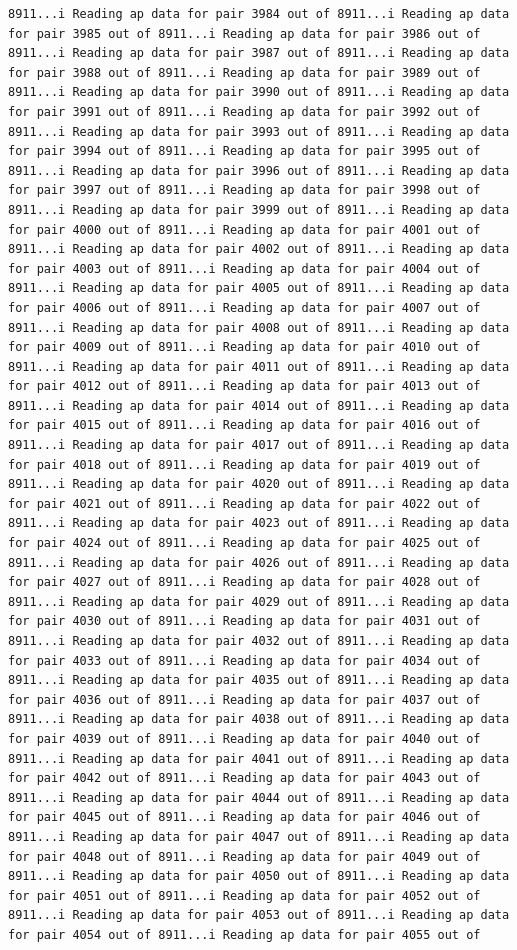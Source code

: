 \documentclass[
]{article}
\begin{document}
\begin{verbatim}
8911...i Reading ap data for pair 3984 out of 8911...i Reading ap data for pair 3985 out of 8911...i Reading ap data for pair 3986 out of 8911...i Reading ap data for pair 3987 out of 8911...i Reading ap data for pair 3988 out of 8911...i Reading ap data for pair 3989 out of 8911...i Reading ap data for pair 3990 out of 8911...i Reading ap data for pair 3991 out of 8911...i Reading ap data for pair 3992 out of 8911...i Reading ap data for pair 3993 out of 8911...i Reading ap data for pair 3994 out of 8911...i Reading ap data for pair 3995 out of 8911...i Reading ap data for pair 3996 out of 8911...i Reading ap data for pair 3997 out of 8911...i Reading ap data for pair 3998 out of 8911...i Reading ap data for pair 3999 out of 8911...i Reading ap data for pair 4000 out of 8911...i Reading ap data for pair 4001 out of 8911...i Reading ap data for pair 4002 out of 8911...i Reading ap data for pair 4003 out of 8911...i Reading ap data for pair 4004 out of 8911...i Reading ap data for pair 4005 out of 8911...i Reading ap data for pair 4006 out of 8911...i Reading ap data for pair 4007 out of 8911...i Reading ap data for pair 4008 out of 8911...i Reading ap data for pair 4009 out of 8911...i Reading ap data for pair 4010 out of 8911...i Reading ap data for pair 4011 out of 8911...i Reading ap data for pair 4012 out of 8911...i Reading ap data for pair 4013 out of 8911...i Reading ap data for pair 4014 out of 8911...i Reading ap data for pair 4015 out of 8911...i Reading ap data for pair 4016 out of 8911...i Reading ap data for pair 4017 out of 8911...i Reading ap data for pair 4018 out of 8911...i Reading ap data for pair 4019 out of 8911...i Reading ap data for pair 4020 out of 8911...i Reading ap data for pair 4021 out of 8911...i Reading ap data for pair 4022 out of 8911...i Reading ap data for pair 4023 out of 8911...i Reading ap data for pair 4024 out of 8911...i Reading ap data for pair 4025 out of 8911...i Reading ap data for pair 4026 out of 8911...i Reading ap data for pair 4027 out of 8911...i Reading ap data for pair 4028 out of 8911...i Reading ap data for pair 4029 out of 8911...i Reading ap data for pair 4030 out of 8911...i Reading ap data for pair 4031 out of 8911...i Reading ap data for pair 4032 out of 8911...i Reading ap data for pair 4033 out of 8911...i Reading ap data for pair 4034 out of 8911...i Reading ap data for pair 4035 out of 8911...i Reading ap data for pair 4036 out of 8911...i Reading ap data for pair 4037 out of 8911...i Reading ap data for pair 4038 out of 8911...i Reading ap data for pair 4039 out of 8911...i Reading ap data for pair 4040 out of 8911...i Reading ap data for pair 4041 out of 8911...i Reading ap data for pair 4042 out of 8911...i Reading ap data for pair 4043 out of 8911...i Reading ap data for pair 4044 out of 8911...i Reading ap data for pair 4045 out of 8911...i Reading ap data for pair 4046 out of 8911...i Reading ap data for pair 4047 out of 8911...i Reading ap data for pair 4048 out of 8911...i Reading ap data for pair 4049 out of 8911...i Reading ap data for pair 4050 out of 8911...i Reading ap data for pair 4051 out of 8911...i Reading ap data for pair 4052 out of 8911...i Reading ap data for pair 4053 out of 8911...i Reading ap data for pair 4054 out of 8911...i Reading ap data for pair 4055 out of 
\end{verbatim}
\end{document}
